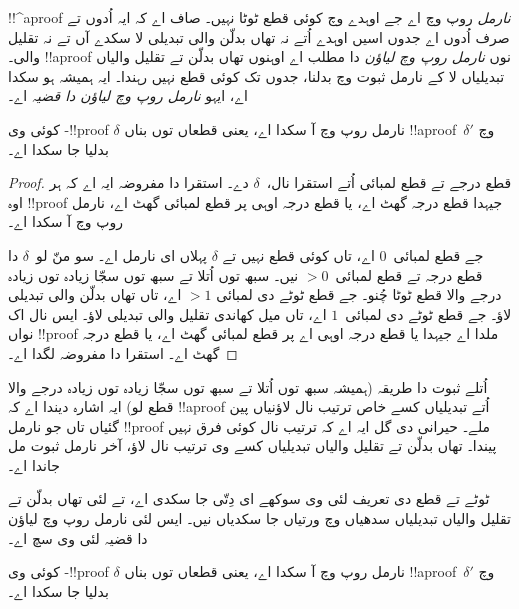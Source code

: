 \documentclass[../../../include/open-logic-section]{subfiles}
\begin{document}


!!^a{proof} \emph{نارمل} روپ وچ اے جے اوہدے وچ کوئی قطع ٹوٹا نہیں۔ صاف اے کہ ایہ اُدوں تے صرف اُدوں اے جدوں اسیں اوہدے اُتے نہ تھاں بدلّن والی تبدیلی لا سکدے آں تے نہ تقلیل والی۔ !!a{proof} نوں \emph{نارمل روپ وچ لیاؤن} دا مطلب اے اوہنوں تھاں بدلّن تے تقلیل والیاں تبدیلیاں لا کے نارمل ثبوت وچ بدلنا، جدوں تک کوئی قطع نہیں رہندا۔ ایہ ہمیشہ ہو سکدا اے، ایہو \emph{نارمل روپ وچ لیاؤن دا قضیہ} اے۔

\begin{thm}
کوئی وی -!!{proof} $\delta$ نارمل روپ وچ آ سکدا اے، یعنی قطعاں توں بناں !!a{proof}~$\delta'$ وچ بدلیا جا سکدا اے۔
\end{thm}

\begin{proof}
قطع درجے تے قطع لمبائی اُتے استقرا نال،~$\delta$ دے۔ استقرا دا مفروضہ ایہ اے کہ ہر اوہ !!{proof} جیہدا قطع درجہ گھٹ اے، یا قطع درجہ اوہی پر قطع لمبائی گھٹ اے، نارمل روپ وچ آ سکدا اے۔

جے قطع لمبائی~$0$ اے، تاں کوئی قطع نہیں تے $\delta$ پہلاں ای نارمل اے۔ سو منّ لو~$\delta$ دا قطع درجہ تے قطع لمبائی~$>
0$ نیں۔ سبھ توں اُتلا تے سبھ توں سجّا زیادہ توں زیادہ درجے والا قطع ٹوٹا چُنو۔ جے قطع ٹوٹے دی لمبائی $>1$ اے، تاں تھاں بدلّن والی تبدیلی لاؤ۔ جے قطع ٹوٹے دی لمبائی~$1$ اے، تاں میل کھاندی تقلیل والی تبدیلی لاؤ۔ ایس نال اک نواں !!{proof} ملدا اے جیہدا یا قطع درجہ اوہی اے پر قطع لمبائی گھٹ اے، یا قطع درجہ گھٹ اے۔ استقرا دا مفروضہ لگدا اے۔
\end{proof}

اُتلے ثبوت دا طریقہ (ہمیشہ سبھ توں اُتلا تے سبھ توں سجّا زیادہ توں زیادہ درجے والا قطع لو) ایہ اشارہ دیندا اے کہ !!a{proof} اُتے تبدیلیاں کسے خاص ترتیب نال لاؤنیاں پین گئیاں تاں جو نارمل !!{proof} ملے۔ حیرانی دی گل ایہ اے کہ ترتیب نال کوئی فرق نہیں پیندا۔ تھاں بدلّن تے تقلیل والیاں تبدیلیاں کسے وی ترتیب نال لاؤ، آخر نارمل ثبوت مل جاندا اے۔

ٹوٹے تے قطع دی تعریف  لئی وی سوکھے ای دِتّی جا سکدی اے، تے  لئی تھاں بدلّن تے تقلیل والیاں تبدیلیاں سدھیاں  وچ ورتیاں جا سکدیاں نیں۔ ایس لئی نارمل روپ وچ لیاؤن دا قضیہ  لئی وی سچ اے۔

\begin{thm}
کوئی وی -!!{proof} $\delta$ نارمل روپ وچ آ سکدا اے، یعنی قطعاں توں بناں !!a{proof}~$\delta'$ وچ بدلیا جا سکدا اے۔
\end{thm}
\end{document}
